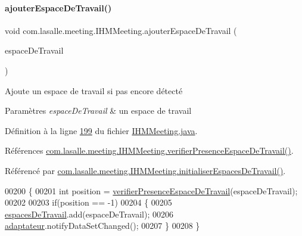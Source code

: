 \paragraph{\texorpdfstring{ajouter\+Espace\+De\+Travail()}{ajouterEspaceDeTravail()}}
{\footnotesize\ttfamily void com.\+lasalle.\+meeting.\+I\+H\+M\+Meeting.\+ajouter\+Espace\+De\+Travail (\begin{DoxyParamCaption}\item[{\hyperlink{classcom_1_1lasalle_1_1meeting_1_1_espace_de_travail}{Espace\+De\+Travail}}]{espace\+De\+Travail }\end{DoxyParamCaption})\hspace{0.3cm}{\ttfamily [private]}}



Ajoute un espace de travail si pas encore détecté 


\begin{DoxyParams}{Paramètres}
{\em espace\+De\+Travail} & un espace de travail \\
\hline
\end{DoxyParams}


Définition à la ligne \hyperlink{_i_h_m_meeting_8java_source_l00199}{199} du fichier \hyperlink{_i_h_m_meeting_8java_source}{I\+H\+M\+Meeting.\+java}.



Références \hyperlink{_i_h_m_meeting_8java_source_l00248}{com.\+lasalle.\+meeting.\+I\+H\+M\+Meeting.\+verifier\+Presence\+Espace\+De\+Travail()}.



Référencé par \hyperlink{_i_h_m_meeting_8java_source_l00171}{com.\+lasalle.\+meeting.\+I\+H\+M\+Meeting.\+initialiser\+Espaces\+De\+Travail()}.


\begin{DoxyCode}
00200     \{
00201         \textcolor{keywordtype}{int} position = \hyperlink{classcom_1_1lasalle_1_1meeting_1_1_i_h_m_meeting_a402dc23f375fae1f1faa3d5728cdad00}{verifierPresenceEspaceDeTravail}(espaceDeTravail);
00202 
00203         \textcolor{keywordflow}{if}(position == -1)
00204         \{
00205             \hyperlink{classcom_1_1lasalle_1_1meeting_1_1_i_h_m_meeting_acba41978aec60c27f07db774f9b68b68}{espacesDeTravail}.add(espaceDeTravail);
00206             \hyperlink{classcom_1_1lasalle_1_1meeting_1_1_i_h_m_meeting_ac103010077163ba43b830ffe524f476d}{adaptateur}.notifyDataSetChanged();
00207         \}
00208     \}
\end{DoxyCode}
\mbox{\label{classcom_1_1lasalle_1_1meeting_1_1_i_h_m_meeting_ab9ef4bd3436aa480f92a5b1922fd6666}} 
